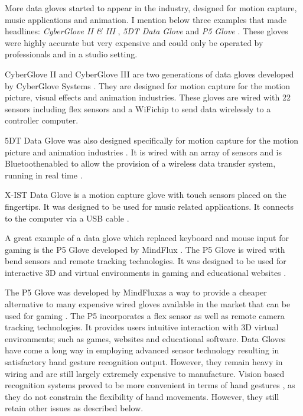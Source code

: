 More data gloves started to appear in the industry, designed for motion capture, music applications and animation. I mention below three examples that made headlines: \textit{CyberGlove II \& III} \parencite{CyberGloveII}, \textit{5DT Data Glove} \parencite{5DTech} and \textit{P5 Glove} \parencite{P5Glove}. These gloves were highly accurate but very expensive and could only be operated by professionals and in a studio setting.

CyberGlove II and CyberGlove III are two generations of data gloves developed by CyberGlove Systems \parencite{CyberGloveII}. They are designed for motion capture for the motion picture, visual effects and animation industries. These gloves are wired with 22 sensors including flex sensors and a WiFi\texttrademark chip to send data wirelessly to a controller computer. 

5DT Data Glove was also designed specifically for motion capture for the motion picture and animation industries \parencite{5DTech}. It is wired with an array of sensors and is Bluetooth\texttrademark enabled to allow the provision of a wireless data transfer system, running in real time \parencite{5DTech}. 

X-IST Data Glove \parencite{XISTDataGlove} is a motion capture glove with touch sensors placed on the fingertips. It was designed to be used for music related applications. It connects to the computer via a USB cable \parencite{XISTDataGlove}. 

A great example of a data glove which replaced keyboard and mouse input for gaming is the P5 Glove developed by MindFlux \parencite{P5Glove}. The P5 Glove is wired with bend sensors and remote tracking technologies. It was designed to be used for interactive 3D and virtual environments in gaming and educational websites \parencite{P5Glove}. 

The P5 Glove was developed by MindFlux\texttrademark as a way to provide a cheaper alternative to many expensive wired gloves available in the market that can be used for gaming \parencite{P5Glove}. The P5 incorporates a flex sensor as well as remote camera tracking technologies. It provides users intuitive interaction with 3D virtual environments; such as games, websites and educational software. Data Gloves have come a long way in employing advanced sensor technology resulting in satisfactory hand gesture recognition output. However, they remain heavy in wiring and are still largely extremely expensive to manufacture. Vision based recognition systems proved to be more convenient in terms of hand gestures \parencite{Lamberti2012}, as they do not constrain the flexibility of hand movements. However, they still retain other issues as described below.

